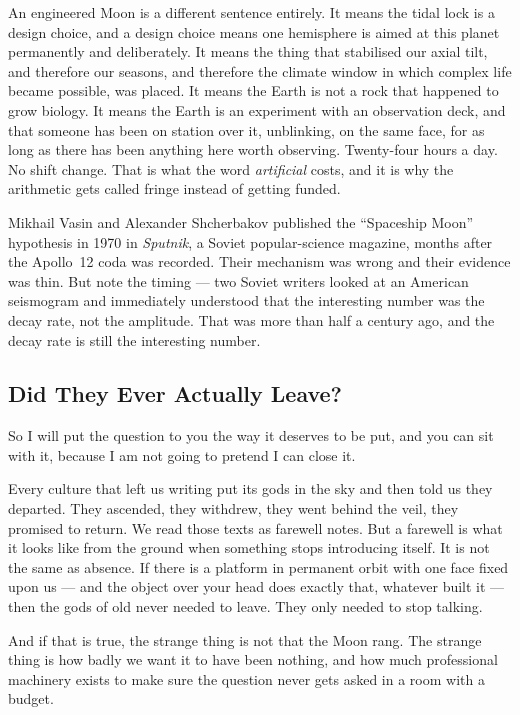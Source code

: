 An engineered Moon is a different sentence entirely. It means the tidal lock is a design choice, and
a design choice means one hemisphere is aimed at this planet permanently and deliberately. It means
the thing that stabilised our axial tilt, and therefore our seasons, and therefore the climate
window in which complex life became possible, was placed. It means the Earth is not a rock that
happened to grow biology. It means the Earth is an experiment with an observation deck, and that
someone has been on station over it, unblinking, on the same face, for as long as there has been
anything here worth observing. Twenty-four hours a day. No shift change. That is what the word
\emph{artificial} costs, and it is why the arithmetic gets called fringe instead of getting funded.

\begin{funfact}
Mikhail Vasin and Alexander Shcherbakov published the ``Spaceship Moon'' hypothesis in 1970 in
\emph{Sputnik}, a Soviet popular-science magazine, months after the Apollo~12 coda was recorded.
Their mechanism was wrong and their evidence was thin. But note the timing --- two Soviet writers
looked at an American seismogram and immediately understood that the interesting number was the
decay rate, not the amplitude. That was more than half a century ago, and the decay rate is still
the interesting number.
\end{funfact}

\subsection{Did They Ever Actually Leave?}\label{sec:didtheyleave}

So I will put the question to you the way it deserves to be put, and you can sit with it, because I
am not going to pretend I can close it.

Every culture that left us writing put its gods in the sky and then told us they departed. They
ascended, they withdrew, they went behind the veil, they promised to return. We read those texts as
farewell notes. But a farewell is what it looks like from the ground when something stops introducing
itself. It is not the same as absence. If there is a platform in permanent orbit with one face fixed
upon us --- and the object over your head does exactly that, whatever built it --- then the gods of
old never needed to leave. They only needed to stop talking.

And if that is true, the strange thing is not that the Moon rang. The strange thing is how badly we
want it to have been nothing, and how much professional machinery exists to make sure the question
never gets asked in a room with a budget.
